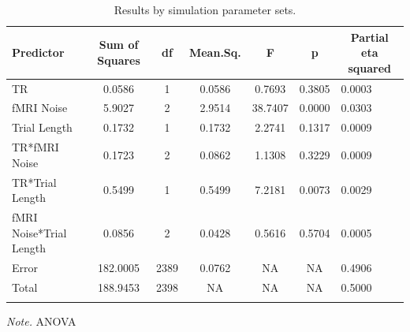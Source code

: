 \documentclass[
  english,
  man,floatsintext]{apa6}
\begin{document}
\begin{table}[tbp]

\begin{center}
\begin{threeparttable}

\caption{\label{tab:unnamed-chunk-2}Results by simulation parameter sets.}

\begin{tabular}{lcccccl}
\toprule
Predictor & \multicolumn{1}{c}{Sum of Squares} & \multicolumn{1}{c}{df} & \multicolumn{1}{c}{Mean.Sq.} & \multicolumn{1}{c}{F} & \multicolumn{1}{c}{p} & \multicolumn{1}{c}{Partial eta squared}\\
\midrule
TR & 0.0586 & 1 & 0.0586 & 0.7693 & 0.3805 & 0.0003\\
fMRI Noise & 5.9027 & 2 & 2.9514 & 38.7407 & 0.0000 & 0.0303\\
Trial Length & 0.1732 & 1 & 0.1732 & 2.2741 & 0.1317 & 0.0009\\
TR*fMRI Noise & 0.1723 & 2 & 0.0862 & 1.1308 & 0.3229 & 0.0009\\
TR*Trial Length & 0.5499 & 1 & 0.5499 & 7.2181 & 0.0073 & 0.0029\\
fMRI Noise*Trial Length & 0.0856 & 2 & 0.0428 & 0.5616 & 0.5704 & 0.0005\\
Error & 182.0005 & 2389 & 0.0762 & NA & NA & 0.4906\\
Total & 188.9453 & 2398 & NA & NA & NA & 0.5000\\
\bottomrule
\addlinespace
\end{tabular}

\begin{tablenotes}[para]
\normalsize{\textit{Note.} ANOVA}
\end{tablenotes}

\end{threeparttable}
\end{center}

\end{table}

\newpage
\end{document}
